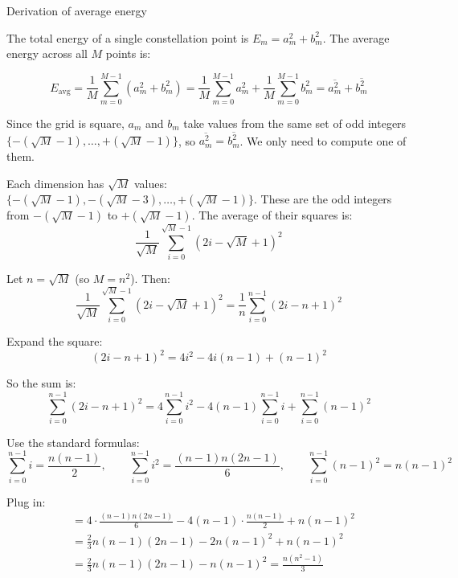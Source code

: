 \begin{KeyBox}{Derivation of average energy}

The total energy of a single constellation point is $E_m = a_m^2 + b_m^2$. The average energy across all $M$ points is:

\begin{equation}
E_{\text{avg}} = \frac{1}{M}\sum_{m=0}^{M-1}\left(a_m^2 + b_m^2\right) = \frac{1}{M}\sum_{m=0}^{M-1}a_m^2 + \frac{1}{M}\sum_{m=0}^{M-1}b_m^2 = \overline{a_m^2} + \overline{b_m^2}
\end{equation}

Since the grid is square, $a_m$ and $b_m$ take values from the same set of odd integers $\{-(\sqrt{M}-1), \ldots, +(\sqrt{M}-1)\}$, so $\overline{a_m^2} = \overline{b_m^2}$. We only need to compute one of them.

\vspace{0.5cm}
Each dimension has $\sqrt{M}$ values: $\{-(\sqrt{M}-1), -(\sqrt{M}-3), \ldots, +(\sqrt{M}-1)\}$. These are the odd integers from $-(\sqrt{M}-1)$ to $+(\sqrt{M}-1)$. The average of their squares is:
\begin{equation}
\frac{1}{\sqrt{M}}\sum_{i=0}^{\sqrt{M}-1}(2i - \sqrt{M} + 1)^2
\end{equation}

Let $n = \sqrt{M}$ (so $M = n^2$). Then:
\begin{equation}
\frac{1}{\sqrt{M}}\sum_{i=0}^{\sqrt{M}-1}(2i - \sqrt{M} + 1)^2 = \frac{1}{n}\sum_{i=0}^{n-1}(2i - n + 1)^2
\end{equation}

Expand the square:
\begin{equation}
(2i - n + 1)^2 = 4i^2 - 4i(n-1) + (n-1)^2
\end{equation}

So the sum is:
\begin{equation}
\sum_{i=0}^{n-1}(2i - n + 1)^2 = 4\sum_{i=0}^{n-1}i^2 - 4(n-1)\sum_{i=0}^{n-1}i + \sum_{i=0}^{n-1}(n-1)^2
\end{equation}

Use the standard formulas:
\begin{equation}
\sum_{i=0}^{n-1}i = \frac{n(n-1)}{2}, \qquad \sum_{i=0}^{n-1}i^2 = \frac{(n-1)n(2n-1)}{6}, \qquad \sum_{i=0}^{n-1}(n-1)^2 = n(n-1)^2
\end{equation}

Plug in:
\begin{align}
&= 4 \cdot \frac{(n-1)n(2n-1)}{6} - 4(n-1) \cdot \frac{n(n-1)}{2} + n(n-1)^2 \nonumber\\[0.5em]
&= \frac{2}{3}n(n-1)(2n-1) - 2n(n-1)^2 + n(n-1)^2 \nonumber\\[0.5em]
&= \frac{2}{3}n(n-1)(2n-1) - n(n-1)^2 = \frac{n(n^2 - 1)}{3}
\end{align}


\end{KeyBox}
